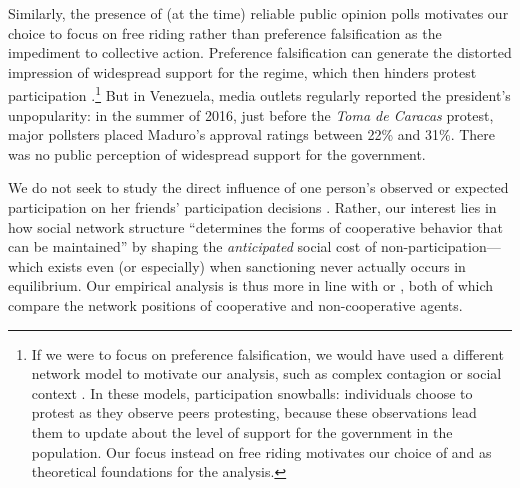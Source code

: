 \documentclass[12pt]{article}
\begin{document}
Similarly, the presence of (at the time) reliable public opinion polls motivates our choice to focus on free riding rather than preference falsification as the impediment to collective action. Preference falsification can generate the distorted impression of widespread support for the regime, which then hinders protest participation \citep{Kuran:2010tz,SteinertThrelkeld:2018wz,Little:2015jo}.\footnote{If we were to focus on preference falsification, we would have used a different network model to motivate our analysis, such as complex contagion \citep{Centola:2018dc,Centola:2007kk} or social context \citep{Siegel:2009vi}. In these models, participation snowballs: individuals choose to protest as they observe peers protesting, because these observations lead them to update about the level of support for the government in the population. Our focus instead on free riding motivates our choice of \citet{Larson:2014ve} and \citet{wolitzky2012} as theoretical foundations for the analysis.} But in Venezuela, media outlets regularly reported the president's unpopularity: in the summer of 2016, just before the \emph{Toma de Caracas} protest, major pollsters placed Maduro's approval ratings between 22\% and 31\%. There was no public perception of widespread support for the government.


We do not seek to study the direct influence of one person's observed or expected participation on her friends' participation decisions \citep[as in, e.g.,][]{Rolfe:2012ka,Siegel:2009vi,Banerjee:2014kl,Eubank:2018,FerraliUganda,CantoniHongKong}. Rather, our interest lies in how social network structure ``determines the forms of cooperative behavior that can be maintained'' \citep[][5]{JacksonJEL} by shaping the \emph{anticipated} social cost of non-participation---which exists even (or especially) when sanctioning never actually occurs in equilibrium. Our empirical analysis is thus more in line with \citet[][1882--1883]{JacksonAER} or \citet{Larson:2016vk}, both of which compare the network positions of cooperative and non-cooperative agents.







\end{document}
